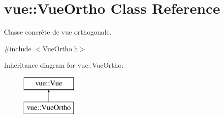 \hypertarget{classvue_1_1_vue_ortho}{}\section{vue\+:\+:Vue\+Ortho Class Reference}
\label{classvue_1_1_vue_ortho}


Classe concrète de vue orthogonale.  




{\ttfamily \#include $<$Vue\+Ortho.\+h$>$}

Inheritance diagram for vue\+:\+:Vue\+Ortho\+:\begin{figure}[H]
\begin{center}
\leavevmode
\includegraphics[height=2.000000cm]{classvue_1_1_vue_ortho}
\end{center}
\end{figure}
